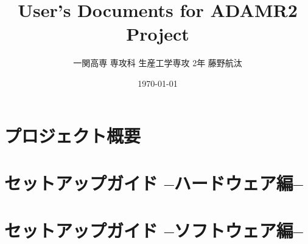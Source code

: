 \documentclass[uplatex, a4paper]{jsreport}
\title{\Huge User's Documents for ADAMR2 Project}
\author{一関高専 専攻科 生産工学専攻 2年 藤野航汰}
\date{\today}
\begin{document}
\maketitle  %

\tableofcontents  %
\newpage

\chapter{プロジェクト概要}




\chapter{セットアップガイド --ハードウェア編--}


\chapter{セットアップガイド --ソフトウェア編--}



\end{document}
